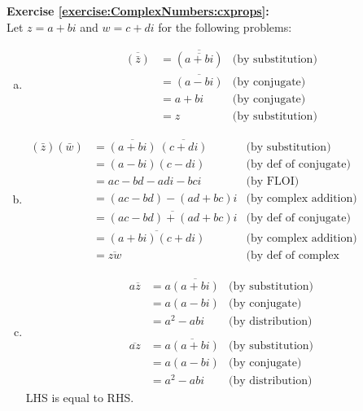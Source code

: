 \noindent\textbf{Exercise \ref{exercise:ComplexNumbers:cxprops}:}\\ %
Let $z=a+bi$ and $w=c+di$ for the following problems:
\begin{enumerate}[(a)]
\item
\begin{align*}
\overline{(\bar{z})} &= \overline{(\overline{a + bi})} &\text{(by substitution)}\\
&= \overline{(a - bi)} &\text{(by conjugate)}\\
&= a + bi &\text{(by conjugate)}\\
&= z &\text{(by substitution)}
\end{align*}

\item
\begin{align*}
(\bar{z})(\bar{w}) &= \overline{(a + bi)} \ \overline{(c + di)} &\text{(by substitution)}\\
&= (a - bi)(c - di) &\text{(by def of conjugate)}\\
&= ac - bd - adi - bci &\text{(by FLOI)}\\
&= (ac - bd) - (ad + bc)i &\text{(by complex addition)}\\
&= \overline{(ac - bd) + (ad + bc)i} &\text{(by def of conjugate)}\\
&= \overline{(a + bi)(c + di)} &\text{(by complex addition)}\\
&= \overline{zw} &\text{(by def of complex multiplication)}
\end{align*}

\item
\begin{align*}
a \overline{z} &= a\overline{(a + bi)} &\text{(by substitution)}\\
&= a(a - bi) &\text{(by conjugate)}\\
&= a^{2} - abi &\text{(by distribution)}\\
\\
\overline{az} &= \overline{a(a + bi)} &\text{(by substitution)}\\
&= a(a - bi) &\text{(by conjugate)}\\
&= a^{2} - abi &\text{(by distribution)}
\end{align*}
LHS is equal to RHS.


\end{enumerate}
